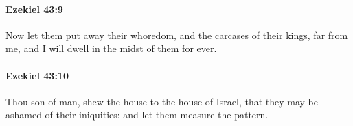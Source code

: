 		\paragraph{Ezekiel 43:9} %
			\label{EZEKIEL-43-9}

			Now let them put away their whoredom, and the carcases of their kings, far from me, and I will dwell in the midst of them for ever.


		\paragraph{Ezekiel 43:10} %
			\label{EZEKIEL-43-10}

			Thou son of man, shew the house to the house of Israel, that they may be ashamed of their iniquities: and let them measure the pattern.


